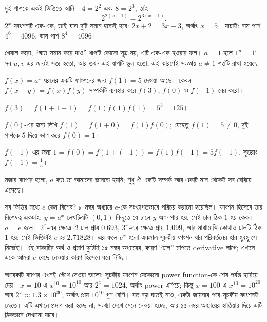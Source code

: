 \documentclass[11pt]{article}
\begin{document}
\begin{solbox}
দুই পাশকে একই ভিত্তিতে আনি। $4 = 2^{2}$ এবং $8 = 2^{3}$, তাই
\[
  2^{2(x+1)} = 2^{3(x-1)} .
\]
$2^{x}$ ফাংশনটি এক-এক, তাই ঘাত দুটি সমান হতেই হবে: $2x + 2 = 3x - 3$, অর্থাৎ
$x = 5$। যাচাই: বাম পাশ $4^{6} = 4096$, ডান পাশ $8^{4} = 4096$।

খেয়াল করো, ``ঘাত সমান করে দাও'' ধাপটি কোনো সূত্র নয়, এটি এক-এক হওয়ার ফল।
$a = 1$ হলে $1^{u} = 1^{v}$ সব $u, v$-এর জন্যই সত্য হতো, আর তখন এই ধাপটি ভুল
হতো; এই কারণেই সংজ্ঞায় $a \neq 1$ শর্তটি রাখা হয়েছে।
\end{solbox}

\begin{example}
$f(x) = a^{x}$ ধরনের একটি ফাংশনের জন্য $f(1) = 5$ দেওয়া আছে। কেবল
$f(x+y) = f(x)f(y)$ সম্পর্কটি ব্যবহার করে $f(3)$, $f(0)$ ও $f(-1)$ বের করো।
\end{example}

\begin{solbox}
$f(3) = f(1+1+1) = f(1)f(1)f(1) = 5^{3} = 125$।

$f(0)$-এর জন্য লিখি $f(1) = f(1+0) = f(1) f(0)$; যেহেতু $f(1) = 5 \neq 0$, দুই
পাশকে $5$ দিয়ে ভাগ করে $f(0) = 1$।

$f(-1)$-এর জন্য $1 = f(0) = f(1 + (-1)) = f(1) f(-1) = 5 f(-1)$, সুতরাং
$f(-1) = \tfrac{1}{5}$।

মজার ব্যাপার হলো, $a$ কত তা আমাদের জানতে হয়নি; শুধু ঐ একটি সম্পর্ক আর একটি মান
থেকেই সব বেরিয়ে এসেছে।
\end{solbox}

\begin{remark}
সব ভিত্তির মধ্যে $e$ কেন বিশেষ? ৮ নম্বর অধ্যায়ে $e$-কে সংখ্যাগতভাবে
পরিচয় করানো হয়েছিল। ফাংশন হিসেবে তার বিশেষত্ব একটাই: $y = a^{x}$ লেখচিত্রটি
$(0,1)$ বিন্দুতে যে ঢালে $y$-অক্ষ পার হয়, সেই ঢাল ঠিক $1$ হয় কেবল $a = e$
হলে। $2^{x}$-এর ক্ষেত্রে ঐ ঢাল প্রায় $0.693$, $3^{x}$-এর ক্ষেত্রে প্রায়
$1.099$, আর মাঝামাঝি কোথাও ঢালটি ঠিক $1$ হয়; সেই ভিত্তিটাই $e \approx 2.71828$।
এর ফলে $e^{x}$ হলো একমাত্র সূচকীয় ফাংশন যার পরিবর্তনের হার হুবহু সে নিজেই।
এই বাক্যটির অর্থ ও প্রমাণ দুটোই ১৫ নম্বর অধ্যায়ের, কারণ ``ঢাল'' মাপতে
derivative লাগে; এখানে একে আমরা $e$ বেছে নেওয়ার কারণ হিসেবে ধরে নিচ্ছি।
\end{remark}

\begin{remark}
আরেকটি ব্যাপার এখনই গেঁথে নেওয়া ভালো: সূচকীয় ফাংশন যেকোনো power function-কে
শেষ পর্যন্ত হারিয়ে দেয়। $x = 10$-এ $x^{10} = 10^{10}$ আর $2^{x} = 1024$, অর্থাৎ
power এগিয়ে; কিন্তু $x = 100$-এ $x^{10} = 10^{20}$ আর
$2^{x} \approx 1.3 \times 10^{30}$, অর্থাৎ প্রায় $10^{10}$ গুণ বেশি। যত বড় ঘাতই নাও, একটা
জায়গার পরে সূচকীয় ফাংশনই জেতে। এটি এখানে প্রমাণ করা হচ্ছে না; সংখ্যা দেখে
মেনে নেওয়া হচ্ছে, আর ১৫ নম্বর অধ্যায়ের হাতিয়ার দিয়ে এটি ঠিকভাবে দেখানো
যাবে।
\end{remark}
\end{document}
